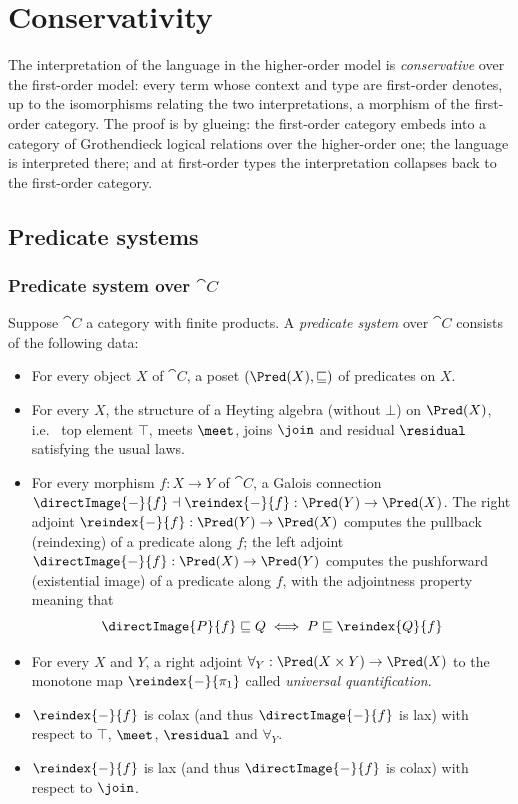 \section{Conservativity}
\label{sec:conservativity}

The interpretation of the language in the higher-order model is \emph{conservative} over the first-order
model: every term whose context and type are first-order denotes, up to the isomorphisms relating the two
interpretations, a morphism of the first-order category. The proof is by glueing: the first-order
category embeds into a category of Grothendieck logical relations \citep{fiore-simpson99} over the
higher-order one; the language is interpreted there; and at first-order types the interpretation
collapses back to the first-order category.

\subsection{Predicate systems}
\label{sec:predicate-system}

\subsubsection{Predicate system over $\cat{C}$}

Suppose $\cat{C}$ a category with finite products. A \emph{predicate system} over $\cat{C}$ consists of the
following data:
\begin{itemize}
\item For every object $X$ of $\cat{C}$, a poset $(\Pred(X), \sqsubseteq)$ of predicates on $X$.
\item For every $X$, the structure of a Heyting algebra (without $\bot$) on $\Pred(X)$, i.e.~ top element
   $\top$, meets $\meet$, joins $\join$ and residual $\residual$ satisfying the usual laws.
\item For every morphism $f: X \to Y$ of $\cat{C}$, a Galois connection $\directImage{-}{f} \dashv
\reindex{-}{f} : \Pred(Y) \to \Pred(X)$. The right adjoint $\reindex{-}{f}: \Pred(Y) \to \Pred(X)$ computes
the pullback (reindexing) of a predicate along $f$; the left adjoint $\directImage{-}{f}: \Pred(X) \to
\Pred(Y)$ computes the pushforward (existential image) of a predicate along $f$, with the adjointness property
meaning that
\[\directImage{P}{f} \sqsubseteq Q \iff P \sqsubseteq \reindex{Q}{f} \]
\item For every $X$ and $Y$, a right adjoint $\forall_Y: \Pred(X \times Y) \to \Pred(X)$ to the monotone map
$\reindex{-}{\pi_1}$ called \emph{universal quantification}.
\item $\reindex{-}{f}$ is colax (and thus $\directImage{-}{f}$ is lax) with respect to $\top$, $\meet$,
$\residual$ and $\forall_Y$.
\item $\reindex{-}{f}$ is lax (and thus $\directImage{-}{f}$ is colax) with respect to $\join$.
\end{itemize}

